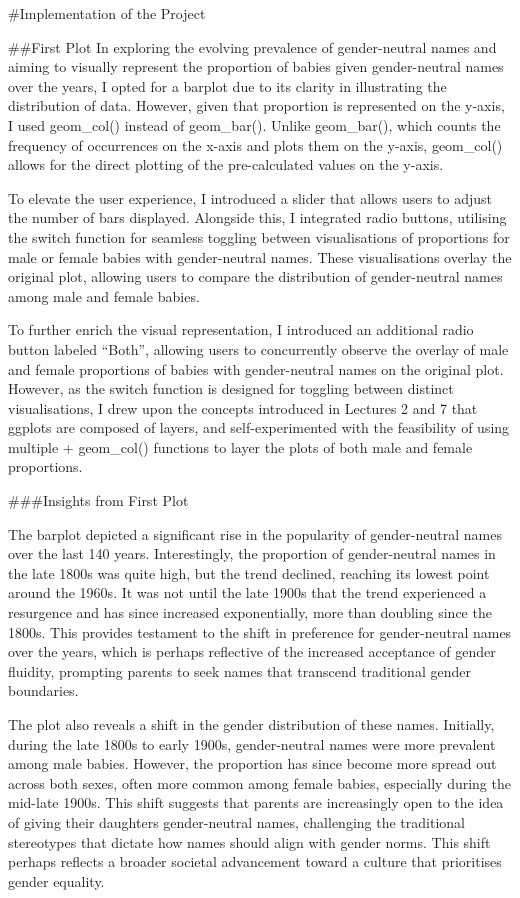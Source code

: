 \documentclass[
]{article}
\begin{document}
\#Implementation of the Project

\#\#First Plot In exploring the evolving prevalence of gender-neutral
names and aiming to visually represent the proportion of babies given
gender-neutral names over the years, I opted for a barplot due to its
clarity in illustrating the distribution of data. However, given that
proportion is represented on the y-axis, I used geom\_col() instead of
geom\_bar(). Unlike geom\_bar(), which counts the frequency of
occurrences on the x-axis and plots them on the y-axis, geom\_col()
allows for the direct plotting of the pre-calculated values on the
y-axis.

To elevate the user experience, I introduced a slider that allows users
to adjust the number of bars displayed. Alongside this, I integrated
radio buttons, utilising the switch function for seamless toggling
between visualisations of proportions for male or female babies with
gender-neutral names. These visualisations overlay the original plot,
allowing users to compare the distribution of gender-neutral names among
male and female babies.

To further enrich the visual representation, I introduced an additional
radio button labeled ``Both'', allowing users to concurrently observe
the overlay of male and female proportions of babies with gender-neutral
names on the original plot. However, as the switch function is designed
for toggling between distinct visualisations, I drew upon the concepts
introduced in Lectures 2 and 7 that ggplots are composed of layers, and
self-experimented with the feasibility of using multiple + geom\_col()
functions to layer the plots of both male and female proportions.

\#\#\#Insights from First Plot

The barplot depicted a significant rise in the popularity of
gender-neutral names over the last 140 years. Interestingly, the
proportion of gender-neutral names in the late 1800s was quite high, but
the trend declined, reaching its lowest point around the 1960s. It was
not until the late 1900s that the trend experienced a resurgence and has
since increased exponentially, more than doubling since the 1800s. This
provides testament to the shift in preference for gender-neutral names
over the years, which is perhaps reflective of the increased acceptance
of gender fluidity, prompting parents to seek names that transcend
traditional gender boundaries.

The plot also reveals a shift in the gender distribution of these names.
Initially, during the late 1800s to early 1900s, gender-neutral names
were more prevalent among male babies. However, the proportion has since
become more spread out across both sexes, often more common among female
babies, especially during the mid-late 1900s. This shift suggests that
parents are increasingly open to the idea of giving their daughters
gender-neutral names, challenging the traditional stereotypes that
dictate how names should align with gender norms. This shift perhaps
reflects a broader societal advancement toward a culture that
prioritises gender equality.
\end{document}
